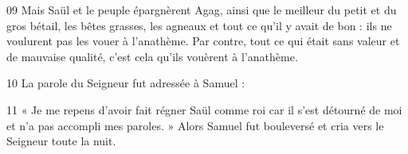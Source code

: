 
09 Mais Saül et le peuple épargnèrent Agag, ainsi que le meilleur du petit et du gros bétail, les bêtes grasses, les agneaux et tout ce qu’il y avait de bon : ils ne voulurent pas les vouer à l’anathème. Par contre, tout ce qui était sans valeur et de mauvaise qualité, c’est cela qu’ils vouèrent à l’anathème.

10 La parole du Seigneur fut adressée à Samuel :

11 « Je me repens d’avoir fait régner Saül comme roi car il s’est détourné de moi et n’a pas accompli mes paroles. » Alors Samuel fut bouleversé et cria vers le Seigneur toute la nuit.